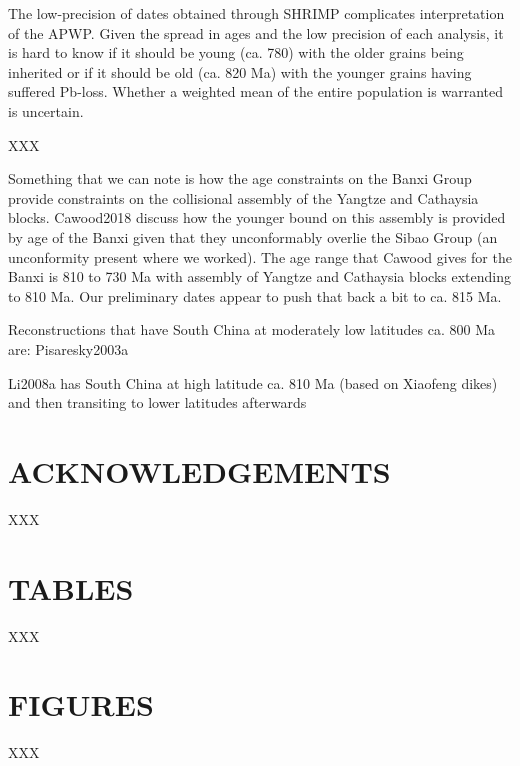 \documentclass[11pt,letterpaper]{article}
\begin{document}
The low-precision of dates obtained through SHRIMP complicates interpretation of the APWP. Given the spread in ages and the low precision of each analysis, it is hard to know if it should be young (ca. 780) with the older grains being inherited or if it should be old (ca. 820 Ma) with the younger grains having suffered Pb-loss. Whether a weighted mean of the entire population is warranted is uncertain.

XXX

Something that we can note is how the age constraints on the Banxi Group provide constraints on the collisional assembly of the Yangtze and Cathaysia blocks. Cawood2018 discuss how the younger bound on this assembly is provided by age of the Banxi given that they unconformably overlie the Sibao Group (an unconformity present where we worked). The age range that Cawood gives for the Banxi is 810 to 730 Ma with assembly of Yangtze and Cathaysia blocks extending to 810 Ma. Our preliminary dates appear to push that back a bit to ca. 815 Ma.

Reconstructions that have South China at moderately low latitudes ca. 800 Ma are: Pisaresky2003a

Li2008a has South China at high latitude ca. 810 Ma (based on Xiaofeng dikes) and then transiting to lower latitudes afterwards

\section*{ACKNOWLEDGEMENTS \label{sec:ACKNOWLEDGEMENTS}}

XXX

\clearpage
\newpage

\section*{TABLES}

XXX

\clearpage
\newpage

\section*{FIGURES}

XXX

\clearpage
\newpage
\footnotesize

\singlespacing



\end{document}
